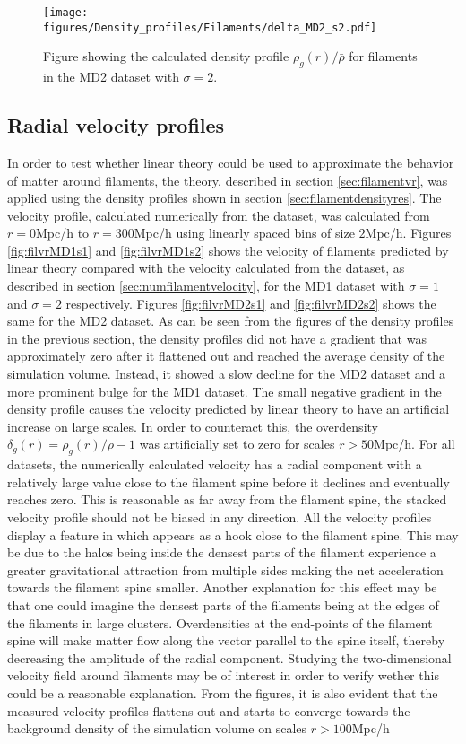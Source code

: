 \begin{figure}[H]
    \texttt{[image: figures/Density\_profiles/Filaments/delta\_MD2\_s2.pdf]}
    \caption{Figure showing the calculated density profile $\rho_g(r)/\bar{\rho}$ for filaments in the MD2 dataset with $\sigma=2$.}
    \label{fig:fildensitytMD2s2}
\end{figure}
\subsection{Radial velocity profiles}
In order to test whether linear theory could be used to approximate the behavior of matter around filaments, the theory, described in section \ref{sec:filamentvr}, was applied using the density profiles shown in section \ref{sec:filamentdensityres}. The velocity profile, calculated numerically from the dataset, was calculated from $r=0$Mpc/h to $r=300$Mpc/h using linearly spaced bins of size $2$Mpc/h. Figures \ref{fig:filvrMD1s1} and \ref{fig:filvrMD1s2} shows the velocity of filaments predicted by linear theory compared with the velocity calculated from the dataset, as described in section \ref{sec:numfilamentvelocity}, for the MD1 dataset with $\sigma=1$ and $\sigma=2$ respectively. Figures \ref{fig:filvrMD2s1} and \ref{fig:filvrMD2s2} shows the same for the MD2 dataset. As can be seen from the figures of the density profiles in the previous section, the density profiles did not have a gradient that was approximately zero after it flattened out and reached the average density of the simulation volume. Instead, it showed a slow decline for the MD2 dataset and a more prominent bulge for the MD1 dataset. The small negative gradient in the density profile causes the velocity predicted by linear theory to have an artificial increase on large scales. In order to counteract this, the overdensity $\delta_g(r)=\rho_g(r)/\bar{\rho}-1$ was artificially set to zero for scales $r>50$Mpc/h. For all datasets, the numerically calculated velocity has a radial component with a relatively large value close to the filament spine before it declines and eventually reaches zero. This is reasonable as far away from the filament spine, the stacked velocity profile should not be biased in any direction. All the velocity profiles display a feature in which appears as a hook close to the filament spine. This may be due to the halos being inside the densest parts of the filament experience a greater gravitational attraction from multiple sides making the net acceleration towards the filament spine smaller. Another explanation for this effect may be that one could imagine the densest parts of the filaments being at the edges of the filaments in large clusters. Overdensities at the end-points of the filament spine will make matter flow along the vector parallel to the spine itself, thereby decreasing the amplitude of the radial component. Studying the two-dimensional velocity field around filaments may be of interest in order to verify wether this could be a reasonable explanation. From the figures, it is also evident that the measured velocity profiles flattens out and starts to converge towards the background density of the simulation volume on scales $r>100$Mpc/h \\\indent

